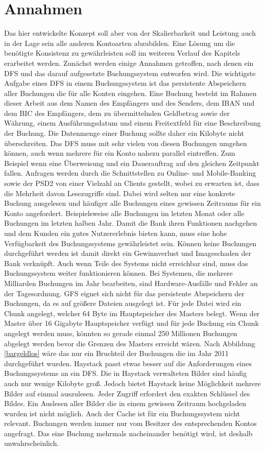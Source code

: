 \documentclass[12pt,oneside,a4paper,parskip]{scrbook}
\begin{document}
\section{Annahmen}
Das hier entwickelte Konzept soll aber von der Skalierbarkeit und Leistung auch in der Lage sein alle anderen Kontoarten abzubilden. Eine Lösung um die benötigte Konsistenz zu gewährleisten soll im weiteren Verlauf des Kapitels erarbeitet werden. Zunächst werden einige Annahmen getroffen, nach denen ein DFS und das darauf aufgesetzte Buchungssystem entworfen wird. Die wichtigste Aufgabe eines DFS in einem Buchungssystem ist das persistente Abspeichern aller Buchungen die für alle Konten eingehen. Eine Buchung besteht im Rahmen dieser Arbeit aus dem Namen des Empfängers und des Senders, dem IBAN und dem BIC des Empfängers, dem zu übermittelnden Geldbetrag sowie der Währung, einem Ausführungsdatum und einem Freitextfeld für eine Beschreibung der Buchung. Die Datenmenge einer Buchung sollte daher ein Kilobyte nicht überschreiten. Das DFS muss mit sehr vielen von diesen Buchungen umgehen können, auch wenn mehrere für ein Konto nahezu parallel eintreffen. Zum Beispiel wenn eine Überweisung und ein Dauerauftrag auf den gleichen Zeitpunkt fallen. Anfragen werden durch die Schnittstellen zu Online- und Mobile-Banking sowie der PSD2 von einer Vielzahl an Clients gestellt, wobei zu erwarten ist, dass die Mehrheit davon Lesezugriffe sind. Dabei wird selten nur eine konkrete Buchung ausgelesen und häufiger alle Buchungen eines gewissen Zeitraums für ein Konto angefordert. Beispielsweise alle Buchungen im letzten Monat oder alle Buchungen im letzten halben Jahr. Damit die Bank ihren Funktionen nachgehen und dem Kunden ein gutes Nutzererlebnis bieten kann, muss eine hohe Verfügbarkeit des Buchungssystems gewährleistet sein. Können keine Buchungen durchgeführt werden ist damit direkt ein Gewinnverlust und Imageschaden der Bank verknüpft. Auch wenn Teile des Systems nicht erreichbar sind, muss das Buchungssystem weiter funktionieren können. Bei Systemen, die mehrere Milliarden Buchungen im Jahr bearbeiten, sind Hardware-Ausfälle und Fehler an der Tagesordnung. 
GFS eignet sich nicht für das persistente Abspeichern der Buchungen, da es auf größere Dateien ausgelegt ist. Für jede Datei wird ein Chunk angelegt, welcher 64 Byte im Hauptspeicher des Masters belegt. Wenn der Master über 16 Gigabyte Hauptspeicher verfügt und für jede Buchung ein Chunk angelegt werden muss, könnten so gerade einmal 250 Millionen Buchungen abgelegt werden bevor die Grenzen des Masters erreicht wären. Nach Abbildung \ref{bargeldlos} wäre das nur ein Bruchteil der Buchungen die im Jahr 2011 durchgeführt wurden. Haystack passt etwas besser auf die Anforderungen eines Buchungssystems an ein DFS. Die in Haystack verwalteten Bilder sind häufig auch nur wenige Kilobyte groß. Jedoch bietet Haystack keine Möglichkeit mehrere Bilder auf einmal auszulesen. Jeder Zugriff erfordert den exakten Schlüssel des Bildes. Ein Auslesen aller Bilder die in einem gewissen Zeitraum hochgeladen wurden ist nicht möglich. Auch der Cache ist für ein Buchungssystem nicht relevant. Buchungen werden immer nur vom Besitzer des entsprechenden Kontos angefragt. Das eine Buchung mehrmals nacheinander benötigt wird, ist deshalb unwahrscheinlich.
\end{document}
